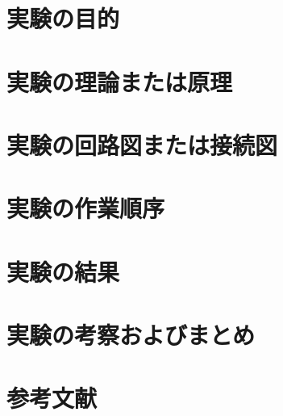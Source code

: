 \documentclass[a4paper,11pt,xelatex,ja=standard]{bxjsarticle}
\begin{document}
\section{実験の目的}
\section{実験の理論または原理}
\section{実験の回路図または接続図}
\section{実験の作業順序}
\section{実験の結果}
\section{実験の考察およびまとめ}
\section{参考文献}
\end{document}
